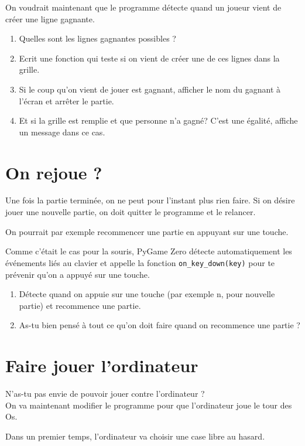 \documentclass[11pt]{article}
\begin{document}
On voudrait maintenant que le programme détecte quand un joueur vient de créer une ligne gagnante.
\begin{enumerate}
    \item Quelles sont les lignes gagnantes possibles ?
    \item Ecrit une fonction qui teste si on vient de créer une de ces lignes dans la grille.
    \item Si le coup qu'on vient de jouer est gagnant, afficher le nom du gagnant à l'écran et arrêter le partie.
    \item Et si la grille est remplie et que personne n'a gagné? C'est une égalité, affiche un message dans ce cas.
\end{enumerate}

\section{On rejoue ?}

Une fois la partie terminée, on ne peut pour l'instant plus rien faire. Si on désire jouer une nouvelle partie, on doit quitter le programme et le relancer.

On pourrait par exemple recommencer une partie en appuyant sur une touche.

Comme c'était le cas pour la souris, PyGame Zero détecte automatiquement les événements liés au clavier et appelle la fonction \lstinline{on_key_down(key)} pour te prévenir qu'on a appuyé sur une touche. 

\begin{enumerate}
    \item Détecte quand on appuie sur une touche (par exemple n, pour nouvelle partie) et recommence une partie.
    \item As-tu bien pensé à tout ce qu'on doit faire quand on recommence une partie ?
\end{enumerate}

\pagebreak

\section{Faire jouer l'ordinateur}

N'as-tu pas envie de pouvoir jouer contre l'ordinateur ?\\
On va maintenant modifier le programme pour que l'ordinateur joue le tour des Os.

Dans un premier temps, l'ordinateur va choisir une case libre au hasard.
\end{document}
